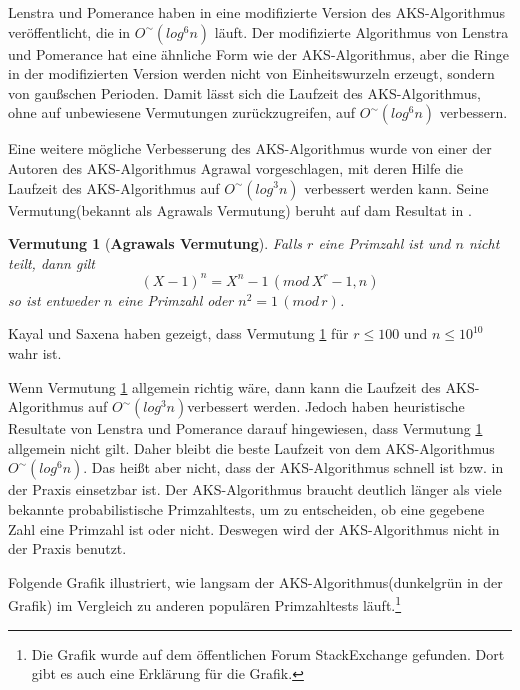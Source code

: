 \documentclass[12pt,oneside]{article}
\newtheorem{conj}[theorem]{Vermutung}
\theoremstyle{remark}
\theoremstyle{definition}
\begin{document}
Lenstra und Pomerance haben in \cite{lenstra-pomerance} eine modifizierte Version des AKS-Algorithmus veröffentlicht, die in $O^{\sim}(log^6 n)$ läuft. Der modifizierte Algorithmus von Lenstra und Pomerance hat eine ähnliche Form wie der AKS-Algorithmus, aber die Ringe in der modifizierten Version werden nicht von Einheitswurzeln erzeugt, sondern von gaußschen Perioden. Damit lässt sich die Laufzeit des AKS-Algorithmus, ohne auf unbewiesene Vermutungen zurückzugreifen, auf $O^{\sim}(log^6 n)$ verbessern.

Eine weitere mögliche Verbesserung des AKS-Algorithmus wurde von einer   der Autoren des AKS-Algorithmus Agrawal vorgeschlagen, mit deren Hilfe die Laufzeit des AKS-Algorithmus auf $O^{\sim}(log^3n)$ verbessert werden kann. Seine Vermutung(bekannt als Agrawals Vermutung) beruht auf dam Resultat in \cite{bhattc-pandey}.

\begin{conj}[\textbf{Agrawals Vermutung}]\label{agrawals-conj}
Falls $r$ eine Primzahl ist und $n$ nicht teilt, dann gilt
\begin{equation}
    (X - 1)^n = X^n - 1\, (mod \, X^{r} - 1,n)
\end{equation}
so ist entweder $n$ eine Primzahl oder $n^2 = 1 \,( mod \, r)$.
\end{conj}
Kayal und Saxena \cite{kayal-saxena} haben gezeigt, dass Vermutung \ref{agrawals-conj} für $r \leq 100$ und $n \leq 10^{10}$ wahr ist.

Wenn Vermutung \ref{agrawals-conj} allgemein richtig wäre, dann kann die Laufzeit des AKS-Algorithmus auf $O^{\sim}(log^3 n)$verbessert werden. Jedoch haben heuristische Resultate von Lenstra und Pomerance darauf hingewiesen, dass Vermutung \ref{agrawals-conj} allgemein nicht gilt\cite{aks}. Daher bleibt die beste Laufzeit von dem AKS-Algorithmus $O^{\sim}(log^6n)$. Das heißt aber nicht, dass der AKS-Algorithmus schnell ist bzw. in der Praxis einsetzbar ist. Der AKS-Algorithmus braucht deutlich länger als viele bekannte probabilistische Primzahltests, um zu entscheiden, ob eine gegebene Zahl eine Primzahl ist oder nicht. Deswegen wird der AKS-Algorithmus nicht in der Praxis benutzt. 

Folgende Grafik illustriert, wie langsam der AKS-Algorithmus(dunkelgrün in der Grafik) im Vergleich zu anderen populären Primzahltests läuft\cite{comparison}.\footnote{Die Grafik wurde auf dem öffentlichen Forum StackExchange gefunden. Dort gibt es auch eine Erklärung für die Grafik.}
\end{document}
